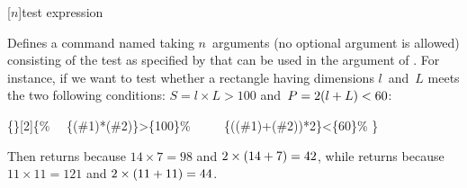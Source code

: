 \documentclass{article}
\begin{document}
\begin{displaytex}
  [$n$]{test expression}
\end{displaytex}
%
Defines a command named  taking $n$~arguments (no optional
argument is allowed) consisting of the test as specified by  that can be used in the argument of .  For
instance, if we want to test whether a rectangle having dimensions
$l$~and~$L$ meets the two following conditions: $S = l \times L > 100$
and~$P = 2 (l +\nobreak L) < 60$:
%
\begin{displaytex}
\{\}[2]\{\%\newline
\ \ \{(\#1)*(\#2)\}>\{100\}\%\newline
\ \ \newline
\ \ \{((\#1)+(\#2))*2\}<\{60\}\%\newline
\}
\end{displaytex}
%
Then 
returns  because $14\times 7 =
98$ and $2\times (14 +\nobreak 7) = 42$, while
 returns  because
$11 \times 11 = 121$ and $2\times (11 +\nobreak 11) = 44$.
\end{document}
